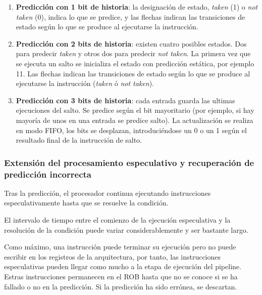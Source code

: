 \documentclass[10pt,a4paper,spanish]{report}
\begin{document}
\begin{enumerate}[\color{azul}{$\heartsuit$}]
    \item \textbf{\textcolor{azul}{Predicción con 1 bit de historia}}: la designación de estado, \textit{\textcolor{azul}{taken}} (1) o \textit{\textcolor{azul}{not taken}} (0), indica lo que se predice, y las flechas indican las transiciones de estado según lo que se produce al ejecutarse la instrucción.

    \item \textbf{\textcolor{azul}{Predicción con 2 bits de historia}}: existen cuatro posibles estados. Dos para predecir \textit{\textcolor{azul}{taken}} y otros dos para predecir \textit{\textcolor{azul}{not taken}}. La primera vez que se ejecuta un salto se inicializa el estado con predicción estática, por ejemplo 11. Las flechas indican las transiciones de estado según lo que se produce al ejecutarse la instrucción (\textit{\textcolor{azul}{taken}} ó \textit{\textcolor{azul}{not taken}}).

    \item \textbf{\textcolor{azul}{Predicción con 3 bits de historia}}: cada entrada guarda las ultimas ejecuciones del salto. Se predice según el bit mayoritario (por ejemplo, si hay mayoría de unos en una entrada se predice salto). La actualización se realiza en modo FIFO, los bits se desplazan, introduciéndose un 0 o un 1 según el resultado final de la instrucción de salto.
\end{enumerate}

\textcolor{azul}{\subsubsection{Extensión del procesamiento especulativo y recuperación de predicción incorrecta}}
Tras la predicción, el procesador continua ejecutando instrucciones especulativamente hasta que se resuelve la condición.

El intervalo de tiempo entre el comienzo de la ejecución especulativa y la resolución de la condición puede variar considerablemente y ser bastante largo.

Como máximo, una instrucción puede terminar su ejecución pero no puede escribir en los registros de la arquitectura, por tanto, las instrucciones especulativas pueden llegar como mucho a la etapa de ejecución del pipeline. Estras instrucciones permanecen en el ROB hasta que no se conoce si se ha fallado o no en la predicción. Si la predicción ha sido errónea, se descartan.
\end{document}
